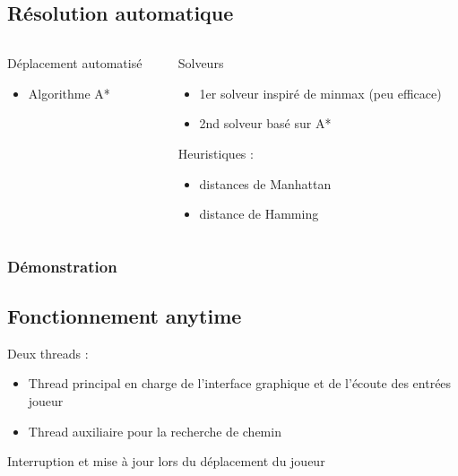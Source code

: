 \documentclass{beamer}
\begin{document}
\subsection{Résolution automatique}
\begin{frame}
\begin{columns}
\begin{column}{5cm}
Déplacement automatisé
\begin{itemize}
\item Algorithme A*
\end{itemize}
\end{column}
\pause
\begin{column}{5cm}
Solveurs
\begin{itemize}
\item 1er solveur inspiré de minmax (peu efficace)
\item 2nd solveur basé sur A*
\end{itemize}
Heuristiques :
\begin{itemize}
\item distances de Manhattan
\item distance de Hamming
\end{itemize}
\end{column}
\end{columns}
\end{frame}

\begin{frame}
\frametitle{Démonstration}
\end{frame}

\subsection{Fonctionnement anytime}
\begin{frame}
Deux threads :
\begin{itemize}
\item Thread principal en charge de l'interface graphique et de l'écoute des entrées joueur
\item Thread auxiliaire pour la recherche de chemin
\end{itemize}
Interruption et mise à jour lors du déplacement du joueur
\end{frame}
\end{document}
